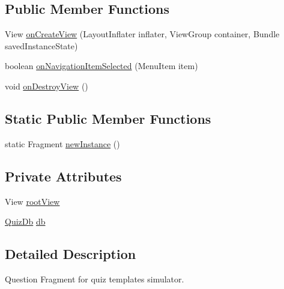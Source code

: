 \subsection*{Public Member Functions}
\begin{DoxyCompactItemize}
\item 
View \hyperlink{classorg_1_1buildmlearn_1_1toolkit_1_1quiztemplate_1_1fragment_1_1QuestionFragment_afaae1ebcf105bbf0ea03133e681dfcc2}{on\+Create\+View} (Layout\+Inflater inflater, View\+Group container, Bundle saved\+Instance\+State)
\item 
boolean \hyperlink{classorg_1_1buildmlearn_1_1toolkit_1_1quiztemplate_1_1fragment_1_1QuestionFragment_a59862ef6207608553c6ee19ca163d933}{on\+Navigation\+Item\+Selected} (Menu\+Item item)
\item 
void \hyperlink{classorg_1_1buildmlearn_1_1toolkit_1_1quiztemplate_1_1fragment_1_1QuestionFragment_a3de6b7e6de901cca971e2b79a789f5d0}{on\+Destroy\+View} ()
\end{DoxyCompactItemize}
\subsection*{Static Public Member Functions}
\begin{DoxyCompactItemize}
\item 
static Fragment \hyperlink{classorg_1_1buildmlearn_1_1toolkit_1_1quiztemplate_1_1fragment_1_1QuestionFragment_aeb1943045dc1f865655e57529d2d07c4}{new\+Instance} ()
\end{DoxyCompactItemize}
\subsection*{Private Attributes}
\begin{DoxyCompactItemize}
\item 
View \hyperlink{classorg_1_1buildmlearn_1_1toolkit_1_1quiztemplate_1_1fragment_1_1QuestionFragment_adf7a5238a59d8994fc6b63954d9a8921}{root\+View}
\item 
\hyperlink{classorg_1_1buildmlearn_1_1toolkit_1_1quiztemplate_1_1data_1_1QuizDb}{Quiz\+Db} \hyperlink{classorg_1_1buildmlearn_1_1toolkit_1_1quiztemplate_1_1fragment_1_1QuestionFragment_a868a9ff3a1617893cadbd53369c71ca8}{db}
\end{DoxyCompactItemize}


\subsection{Detailed Description}
Question Fragment for quiz template\textquotesingle{}s simulator. 

